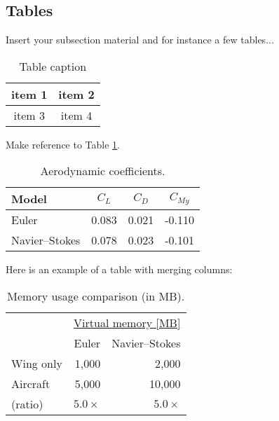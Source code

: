 \subsection{Tables}
\label{subsection:tables}

Insert your subsection material and for instance a few tables...

\begin{table}[h!]
  \begin{center}
    \begin{tabular}{|c|c|}
      \hline
      item 1 & item 2 \\
      \hline
      item 3 & item 4 \\
      \hline
    \end{tabular}
  \end{center}
  \caption[Table caption shown in TOC]{Table caption}
  \label{table:simple}
\end{table}

Make reference to Table \ref{table:simple}.

\begin{table}[!htb]
  \begin{center}
    \begin{tabular}{lccc}
      Model           & $C_L$ & $C_D$ & $C_{M y}$ \\
      \hline
      Euler           & 0.083 & 0.021 & -0.110    \\
      Navier--Stokes  & 0.078 & 0.023 & -0.101    \\
      \hline
    \end{tabular}
  \end{center}
  \caption{Aerodynamic coefficients.}
  \label{tab:aeroCoeff}
\end{table}

Here is an example of a table with merging columns:

\begin{table}[!htb]
  \begin{center}
    \begin{tabular}[]{lrr}
      \hline
                     & \multicolumn{2}{c}{\underline{Virtual memory [MB]}} \\
                     & Euler       & Navier--Stokes \\
      \hline
      Wing only      &  1,000      &    2,000       \\
      Aircraft       &  5,000      &   10,000       \\
      (ratio)        & $5.0\times$ & $5.0\times$    \\
      \hline
    \end{tabular}
  \end{center}
  \caption{Memory usage comparison (in MB).}
  \label{tab:memory}
\end{table}


